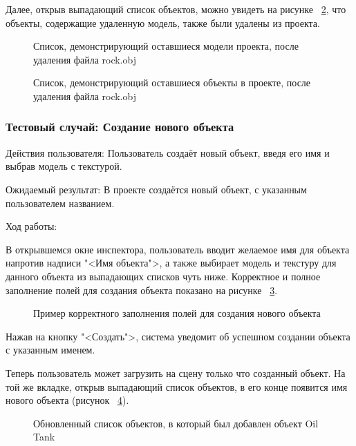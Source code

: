 Далее, открыв выпадающий список объектов, можно увидеть на рисунке ~\ref{screen11:image}, что объекты, содержащие удаленную модель, также были удалены из проекта.

\begin{figure}[H]
	\caption{Список, демонстрирующий оставшиеся модели проекта, после удаления файла rock.obj}
	\label{screen10:image}
\end{figure}

\begin{figure}[H]
	\caption{Список, демонстрирующий оставшиеся объекты в проекте, после удаления файла rock.obj}
	\label{screen11:image}
\end{figure}

\subsubsection{Тестовый случай: Создание нового объекта}
Действия пользователя: Пользователь создаёт новый объект, введя его имя и выбрав модель с текстурой.

Ожидаемый результат: В проекте создаётся новый объект, с указанным пользователем названием.

Ход работы:

В открывшемся окне инспектора, пользователь вводит желаемое имя для объекта напротив надписи "<Имя объекта">, а также выбирает модель и текстуру для данного объекта из выпадающих списков чуть ниже. Корректное и полное заполнение полей для создания объекта показано на рисунке ~\ref{screen12:image}.

\begin{figure}[H]
	\caption{Пример корректного заполнения полей для создания нового объекта}
	\label{screen12:image}
\end{figure}

Нажав на кнопку "<Создать">, система уведомит об успешном создании объекта с указанным именем.

Теперь пользователь может загрузить на сцену только что созданный объект. На той же вкладке, открыв выпадающий список объектов, в его конце появится имя нового объекта (рисунок ~\ref{screen13:image}).

\begin{figure}[H]
	\caption{Обновленный список объектов, в который был добавлен объект Oil Tank}
	\label{screen13:image}
\end{figure}

